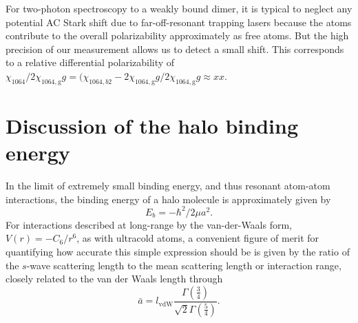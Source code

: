 For two-photon spectroscopy to a weakly bound dimer, it is typical to neglect any potential AC Stark shift due to far-off-resonant trapping lasers because the atoms contribute to the overall polarizability approximately as free atoms. But the high precision of our measurement allows us to detect a small shift. This corresponds to a relative differential polarizability of ${\chi_{1064}}/{2\chi_{1064,\text{g}}g}={(\chi_{1064,b2}-2\chi_{1064,\text{g}}g}/{2\chi_{1064,\text{g}}g}\approx xx$.

\section{Discussion of the halo binding energy} \label{sec:lowE_alt}


In the limit of extremely small binding energy, and thus resonant atom-atom interactions, the binding energy of a halo molecule is approximately given by \cite{kgj06}
\begin{equation}\label{Eq:HaloEnergyNoCorrections}
	E_b=-\hbar^2/2\mu a^2.
\end{equation}
For interactions described at long-range by the van-der-Waals form, $V(r)=-C_6/r^6$, as with ultracold atoms, a convenient figure of merit for quantifying how accurate this simple expression should be is given by the ratio of the $s$-wave scattering length to the mean scattering length or interaction range, closely related to the van der Waals length through \cite{gfl93,cju05}
\begin{equation}\label{Eq:InteractionRangevdW}
  \bar{a}= l_{\mathrm{vdW}}\frac{\Gamma\left(\frac{3}{4}\right)}{\sqrt{2}\Gamma\left(\frac{5}{4}\right)}.
\end{equation}



